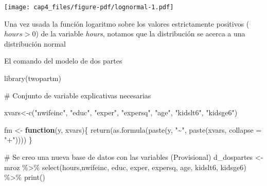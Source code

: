 \documentclass[
  letterpaper,
  DIV=11,
  numbers=noendperiod]{scrreprt}
\newenvironment{Shaded}{\begin{snugshade}}{\end{snugshade}}
\newcommand{\AttributeTok}[1]{\textcolor[rgb]{0.40,0.45,0.13}{#1}}
\newcommand{\CommentTok}[1]{\textcolor[rgb]{0.37,0.37,0.37}{#1}}
\newcommand{\ControlFlowTok}[1]{\textcolor[rgb]{0.00,0.23,0.31}{\textbf{#1}}}
\newcommand{\FunctionTok}[1]{\textcolor[rgb]{0.28,0.35,0.67}{#1}}
\newcommand{\NormalTok}[1]{\textcolor[rgb]{0.00,0.23,0.31}{#1}}
\newcommand{\OtherTok}[1]{\textcolor[rgb]{0.00,0.23,0.31}{#1}}
\newcommand{\SpecialCharTok}[1]{\textcolor[rgb]{0.37,0.37,0.37}{#1}}
\newcommand{\StringTok}[1]{\textcolor[rgb]{0.13,0.47,0.30}{#1}}
\begin{document}
\texttt{[image: cap4\_files/figure-pdf/lognormal-1.pdf]}

Una vez usada la función logaritmo sobre los valores estrictamente
positivos (\(hours>0\)) de la variable \emph{hours}, notamos que la
distribución se acerca a una distribución normal

El comando del modelo de dos partes

\begin{Shaded}
\begin{Highlighting}[]
\FunctionTok{library}\NormalTok{(twopartm)}



\CommentTok{\# Conjunto de variable explicativas necesarias}

\NormalTok{xvars}\OtherTok{\textless{}{-}}\FunctionTok{c}\NormalTok{(}\StringTok{"nwifeinc"}\NormalTok{, }\StringTok{"educ"}\NormalTok{, }\StringTok{"exper"}\NormalTok{, }\StringTok{"expersq"}\NormalTok{, }\StringTok{"age"}\NormalTok{, }\StringTok{"kidslt6"}\NormalTok{, }\StringTok{"kidsge6"}\NormalTok{)}

\NormalTok{fm }\OtherTok{\textless{}{-}} \ControlFlowTok{function}\NormalTok{(y, xvars)\{}
  \FunctionTok{return}\NormalTok{(}\FunctionTok{as.formula}\NormalTok{(}\FunctionTok{paste}\NormalTok{(y, }\StringTok{"\textasciitilde{}"}\NormalTok{, }\FunctionTok{paste}\NormalTok{(xvars, }\AttributeTok{collapse =} \StringTok{"+"}\NormalTok{))))}
\NormalTok{\}}

\CommentTok{\# Se creo una nueva base  de datos con las variables (Provisional)}
\NormalTok{d\_dospartes }\OtherTok{\textless{}{-}}\NormalTok{ mroz }\SpecialCharTok{\%\textgreater{}\%} 
  \FunctionTok{select}\NormalTok{(hours,nwifeinc, educ, exper, expersq, age, kidslt6, kidsge6) }\SpecialCharTok{\%\textgreater{}\%} 
  \FunctionTok{print}\NormalTok{()}
\end{Highlighting}
\end{Shaded}
\end{document}
